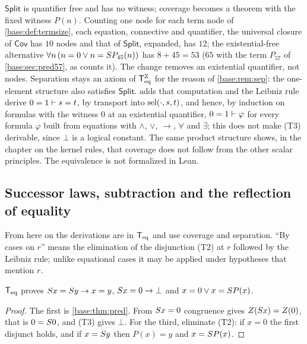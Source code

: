 \begin{remark}
\label{base:rem:split}
$\mathsf{Split}$ is quantifier free and has no witness; coverage becomes a
theorem with the fixed witness $P(n)$.  Counting one node for each term node
of \cref{base:def:termsize}, each equation, connective and quantifier, the
universal closure of $\mathsf{Cov}$ has $10$ nodes and that of
$\mathsf{Split}$, expanded, has $12$; the existential-free alternative
$\forall n\,(n=0\vee n=S P_{45}(n))$ has $8+45=53$ ($65$ with the term
$P_{57}$ of \cref{base:sec:pred57}, as  counts it).  The change removes an
existential quantifier, not nodes.  Separation stays an axiom of
$\mathsf{T}_{\mathrm{eq}}^{\mathrm{Z}}$ for the reason of \cref{base:rem:sep}: the one-element
structure also satisfies $\mathsf{Split}$.   adds that
computation and the Leibniz rule derive $0=1\vdash s=t$, by transport into
$\operatorname{sel}(\cdot,s,t)$, and hence, by induction on formulas with the witness $0$
at an existential quantifier, $0=1\vdash\varphi$ for every formula $\varphi$
built from equations with $\wedge$, $\vee$, $\to$, $\forall$ and $\exists$;
this does not make (T3) derivable, since $\bot$ is a logical constant.  The
same product structure shows, in the chapter on the kernel rules, that
coverage does not follow from the other scalar principles.  The
equivalence is not formalized in Lean.
\end{remark}

\subsection{Successor laws, subtraction and the reflection of equality}

From here on the derivations are in $\mathsf{T}_{\mathrm{eq}}$ and use coverage and separation.
``By cases on $r$'' means the elimination of the disjunction (T2) at $r$
followed by the Leibniz rule; unlike equational cases it may be applied
under hypotheses that mention $r$.

\begin{lemma}
\label{base:lem:succ}
$\mathsf{T}_{\mathrm{eq}}$ proves $S x=S y\to x=y$, $S x=0\to\bot$ and
$x=0\vee x=S P(x)$.
\end{lemma}

\begin{proof}
The first is \cref{base:thm:pred}.  From $S x=0$ congruence gives
$Z(S x)=Z(0)$, that is $0=S 0$, and (T3) gives $\bot$.  For the third,
eliminate (T2): if $x=0$ the first disjunct holds, and if $x=S y$ then
$P(x)=y$ and $x=S P(x)$.
\end{proof}

